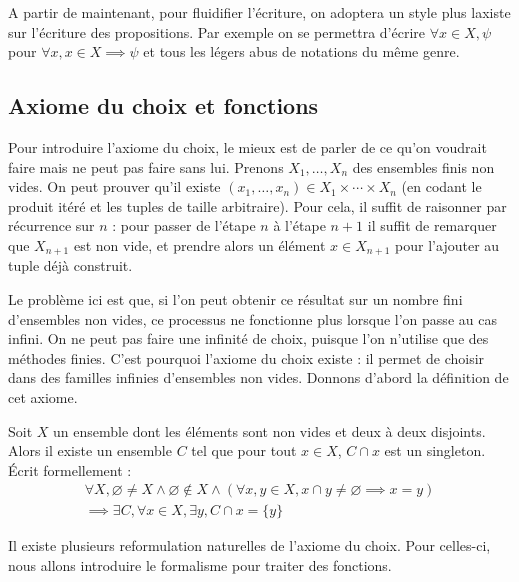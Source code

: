 \begin{notation}
  A partir de maintenant, pour fluidifier l'écriture, on adoptera un style plus
  laxiste sur l'écriture des propositions. Par exemple on se permettra d'écrire
  $\forall x \in X, \psi$ pour $\forall x, x\in X \implies \psi$ et tous les
  légers abus de notations du même genre.
\end{notation}

\subsection{Axiome du choix et fonctions}

Pour introduire l'axiome du choix, le mieux est de parler de ce qu'on voudrait
faire mais ne peut pas faire sans lui. Prenons $X_1,\ldots,X_n$ des ensembles
finis non vides. On peut prouver qu'il existe
$(x_1,\ldots,x_n)\in X_1\times\cdots\times X_n$ (en codant le produit itéré et
les tuples de taille arbitraire). Pour cela, il suffit de raisonner par
récurrence sur $n$ : pour passer de l'étape $n$ à l'étape $n+1$ il suffit de
remarquer que $X_{n+1}$ est non vide, et prendre alors un élément $x\in X_{n+1}$
pour l'ajouter au tuple déjà construit.

Le problème ici est que, si l'on peut obtenir ce résultat sur un nombre fini
d'ensembles non vides, ce processus ne fonctionne plus lorsque l'on passe au cas
infini. On ne peut pas faire une infinité de choix, puisque l'on n'utilise que
des méthodes finies. C'est pourquoi l'axiome du choix existe : il permet de
choisir dans des familles infinies d'ensembles non vides. Donnons d'abord la
définition de cet axiome.

\begin{axiom}[Choix]\label{ax.ZF.AC}
  Soit $X$ un ensemble dont les éléments sont non vides et deux à deux
  disjoints. Alors il existe un ensemble $C$ tel que pour tout $x\in X$,
  $C\cap x$ est un singleton. \'Ecrit formellement :
  \begin{multline*}
  \forall X, \varnothing\neq X \land \varnothing\notin X \land
  (\forall x,y \in X, x \cap y \neq
  \varnothing \implies x = y)
  \\\implies \exists C, \forall x \in X, \exists y, C \cap x = \{y\}
  \end{multline*}
\end{axiom}

Il existe plusieurs reformulation naturelles de l'axiome du choix. Pour
celles-ci, nous allons introduire le formalisme pour traiter des fonctions.

